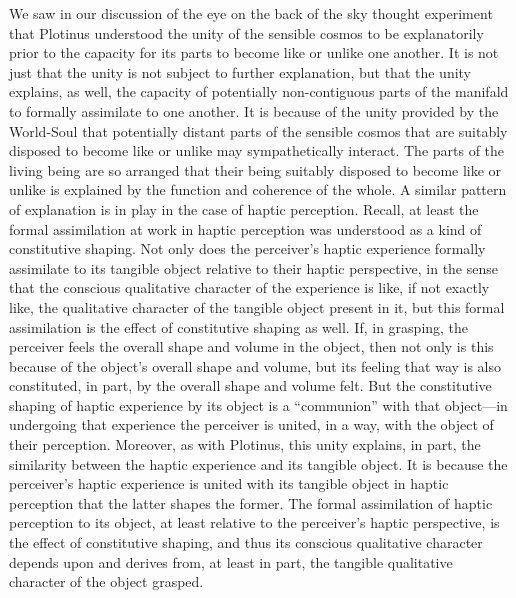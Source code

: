 We saw in our discussion of the eye on the back of the sky thought experiment that Plotinus understood the unity of the sensible cosmos to be explanatorily prior to the capacity for its parts to become like or unlike one another. It is not just that the unity is not subject to further explanation, but that the unity explains, as well, the capacity of potentially non-contiguous parts of the manifald to formally assimilate to one another. It is because of the unity provided by the World-Soul that potentially distant parts of the sensible cosmos that are suitably disposed to become like or unlike may sympathetically interact. The parts of the living being are so arranged that their being suitably disposed to become like or unlike is explained by the function and coherence of the whole. A similar pattern of explanation is in play in the case of haptic perception. Recall, at least the formal assimilation at work in haptic perception was understood as a kind of constitutive shaping. Not only does the perceiver's haptic experience formally assimilate to its tangible object relative to their haptic perspective, in the sense that the conscious qualitative character of the experience is like, if not exactly like, the qualitative character of the tangible object present in it, but this formal assimilation is the effect of constitutive shaping as well. If, in grasping, the perceiver feels the overall shape and volume in the object, then not only is this because of the object's overall shape and volume, but its feeling that way is also constituted, in part, by the overall shape and volume felt. But the constitutive shaping of haptic experience by its object is a ``communion'' with that object---in undergoing that experience the perceiver is united, in a way, with the object of their perception. Moreover, as with Plotinus, this unity explains, in part, the similarity between the haptic experience and its tangible object. It is because the perceiver's haptic experience is united with its tangible object in haptic perception that the latter shapes the former. The formal assimilation of haptic perception to its object, at least relative to the perceiver's haptic perspective, is the effect of constitutive shaping, and thus its conscious qualitative character depends upon and derives from, at least in part, the tangible qualitative character of the object grasped.


